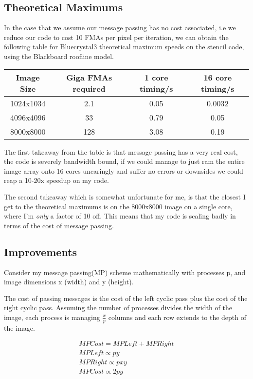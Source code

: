 \documentclass[10pt]{article}
\begin{document}
    \subsection{Theoretical Maximums}
    In the case that we assume our message passing has no cost associated, i.e we reduce our code to cost 10 FMAs per pixel per iteration, we can obtain the
    following table for Bluecrystal3 theoretical maximum speeds on the stencil code, using the Blackboard roofline model.

    \begin{center}
        \begin{tabular}{ | c || c | c | c |} \hline
          Image Size & Giga FMAs required & 1 core timing/s & 16 core timing/s \\ \hline
          1024x1034 & 2.1 & 0.05 & 0.0032 \\ \hline
          4096x4096 & 33 & 0.79 & 0.05 \\ \hline
          8000x8000 & 128 & 3.08 & 0.19 \\ \hline
        \end{tabular}
    \end{center}

    The first takeaway from the table is that message passing has a very real cost, the code is severely bandwidth bound,
    if we could manage to just ram the entire image array onto 16 cores uncaringly and suffer no errors or downsides we could reap a 10-20x speedup on my code.

    The second takeaway which is somewhat unfortunate for me, is that the closest I get to the theoretical maximums is on the 8000x8000 image on a single core, where
    I'm \textit{only} a factor of 10 off. This means that my code is scaling badly in terms of the cost of message passing.

    \subsection{Improvements}
    Consider my message passing(MP) scheme mathematically with processes p, and image dimensions x (width) and y (height).

    The cost of passing messages is the cost of the left cyclic pass plus the cost of the right cyclic pass.
    Assuming the number of processes divides the width of the image, each process is managing $\frac{x}{p}$ columns and each row extends to
    the depth of the image.

    \begin{align*}
      MP Cost = MP Left + MP Right \\
      MP Left \propto py \\
      MP Right \propto pxy \\
      MP Cost \propto 2py
    \end{align*}
\end{document}
